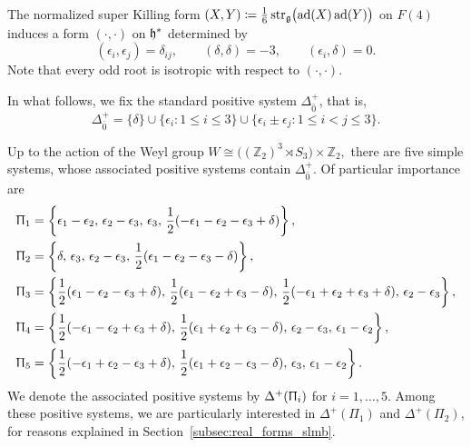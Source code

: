 The normalized super Killing form $(X,Y)\coloneqq\frac16\operatorname{str}_{{\mathfrak{g}}}\bigl(\operatorname{ad}(X)\operatorname{ad}(Y)\bigr)$ on $F(4)$ induces a form $(\cdot,\cdot)$ on ${\mathfrak h}^{\ast}$ determined by 
\begin{equation}\label{eq::F4_bilinear_form}
(\epsilon_i,\epsilon_j)=\delta_{ij},
\qquad
(\delta,\delta)=-3,
\qquad
(\epsilon_i,\delta)=0.
\end{equation}
Note that every odd root is isotropic with respect to $(\cdot,\cdot)$.

In what follows, we fix the standard positive system $\Delta_{\bar0}^{+}$, that is,
\begin{equation}\Delta_{\bar0}^{+} = \{\delta\} \cup\{\epsilon_i:1\leq i\leq3\} \cup\{\epsilon_i\pm\epsilon_j:1\leq i<j\leq3\}.
\end{equation}

Up to the action of the Weyl group
$
W \cong \bigl((\mathbb Z_2)^3\rtimes S_3\bigr)\times\mathbb Z_2,$
there are five simple systems, whose associated positive systems contain $\Delta_{\bar{0}}^{+}$. Of particular importance are 
\begin{equation}
\begin{aligned}
\Uppi_1
&=
\left\{
\epsilon_1-\epsilon_2,\,
\epsilon_2-\epsilon_3,\,
\epsilon_3,\,
\frac12(-\epsilon_1-\epsilon_2-\epsilon_3+\delta)
\right\},
\\
\Uppi_2
&=
\left\{
\delta,\,
\epsilon_3,\,
\epsilon_2-\epsilon_3,\,
\frac12(\epsilon_1-\epsilon_2-\epsilon_3-\delta)
\right\},
\\
\Uppi_3
&=
\left\{
\frac12(\epsilon_1-\epsilon_2-\epsilon_3+\delta),\,
\frac12(\epsilon_1-\epsilon_2+\epsilon_3-\delta),\,
\frac12(-\epsilon_1+\epsilon_2+\epsilon_3+\delta),\,
\epsilon_2-\epsilon_3
\right\},
\\
\Uppi_4
&=
\left\{
\frac12(-\epsilon_1-\epsilon_2+\epsilon_3+\delta),\,
\frac12(\epsilon_1+\epsilon_2+\epsilon_3-\delta),\,
\epsilon_2-\epsilon_3,\,
\epsilon_1-\epsilon_2
\right\},
\\
\Uppi_5
&=
\left\{
\frac12(-\epsilon_1+\epsilon_2-\epsilon_3+\delta),\,
\frac12(\epsilon_1+\epsilon_2-\epsilon_3-\delta),\,
\epsilon_3,\,
\epsilon_1-\epsilon_2
\right\}.
\end{aligned}
\end{equation}
We denote the associated positive systems by $\Delta^{+}(\Uppi_{i})$ for $i=1,\ldots,5$. Among these positive systems, we are particularly interested in
$\Delta^{+}(\Pi_{1})$ and $\Delta^{+}(\Pi_{2})$, for reasons explained in
Section~\ref{subsec:real_forms_slmb}.

